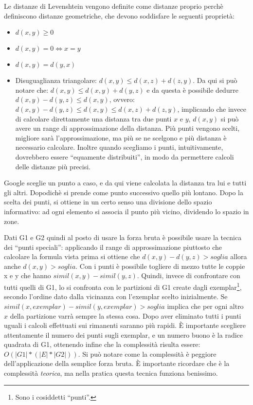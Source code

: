 Le distanze di Levenshtein vengono definite come distanze proprio perch\`e definiscono distanze geometriche, che devono soddisfare le seguenti propriet\`a:
\begin{itemize}
\item $d(x,y) \ge 0$
\item $d(x,y)=0 \Leftrightarrow x=y$
\item $d(x,y) = d(y,x)$
\item Disuguaglianza triangolare: $d(x,y) \le d(x,z) + d(z,y)$. Da qui si pu\`o notare che: $d(x,y) \le d(x,y)+d(y,z)$ e da questa \`e possibile dedurre $d(x,y)-d(y,z) \le d(x,y)$, ovvero: $d(x,y)-d(y,z) \le d(x,y) \le d(x,z)+d(z,y)$, implicando che invece di calcolare direttamente una distanza tra due punti $x$ e $y$, $d(x,y)$ si pu\`o avere un range di approssimazione della distanza. Pi\`u punti vengono scelti, migliore sar\`a l'approssimazione, ma pi\`u se ne scelgono e pi\`u distanza \`e necessario calcolare. Inoltre quando scegliamo i punti, intuitivamente, dovrebbero essere ``equamente distribuiti'', in modo da permettere calcoli delle distanze pi\`u precisi.
\end{itemize}

Google sceglie un punto a caso, e da qui viene calcolata la distanza tra lui e tutti gli altri. Dopodich\`e si prende come punto successivo quello pi\`u lontano. Dopo la scelta dei punti, si ottiene in un certo senso una divisione dello spazio informativo: ad ogni elemento si associa il punto pi\`u vicino, dividendo lo spazio in zone.

Dati G1 e G2 quindi al posto di usare la forza bruta \`e possibile usare la tecnica dei ``punti speciali'': applicando il range di approssimazione piuttosto che calcolare la formula vista prima si ottiene che $d(x,y)-d(y,z) > soglia$ allora anche $d(x,y) > soglia$. Con i punti \`e possibile togliere di mezzo tutte le coppie x e y che hanno $simil(x,y) - simil(y,z)$. Quindi, invece di confrontare con tutti quelli di G1, lo si confronta con le partizioni di G1 create dagli exemplar\footnote{Sono i cosiddetti ``punti''.}, secondo l'ordine dato dalla vicinanza con l'exemplar scelto inizialmente. Se $simil(x,exemplar)-simil(y,exemplar) > soglia$ implica che per ogni altro $x$ della partizione varr\`a sempre la stessa cosa. Dopo aver eliminato tutti i punti uguali i calcoli effettuati sui rimanenti saranno pi\`u rapidi.
\`E importante scegliere attentamente il numero dei punti sugli exemplar, e un numero buono \`e la radice quadrata di G1, ottenendo infine che la complessit\`a risulta essere: $O(|G1|*(|E|*|G2|))$. Si pu\`o notare come la complessit\`a \`e peggiore dell'applicazione della semplice forza bruta. \`E importante ricordare che \`e la complessit\`a \textit{teorica}, ma nella pratica questa tecnica funziona benissimo.

